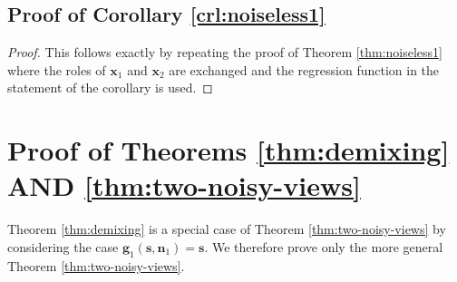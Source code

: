 \subsection{Proof of Corollary \ref{crl:noiseless1}}\label{appendix:proof-cor2}
\begin{proof}
	This follows exactly by repeating the proof of Theorem \ref{thm:noiseless1} where the roles of $\bm{x}_1$ and $\bm{x}_2$ are exchanged and the regression function in the statement of the corollary is used.
\end{proof}

\section{Proof of Theorems \ref{thm:demixing} AND \ref{thm:two-noisy-views}}
\label{appendix:thm1}

Theorem \ref{thm:demixing} is a special case of Theorem \ref{thm:two-noisy-views} by considering the case $\bm{g}_1(\bm{s}, \bm{n}_1) = \bm{s}$.
We therefore prove only the more general Theorem \ref{thm:two-noisy-views}.

